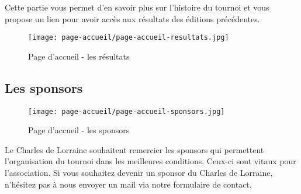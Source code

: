 Cette partie vous permet d'en savoir plus sur l'histoire du tournoi et vous
propose un lien pour avoir accès aux résultats des éditions précédentes.

\begin{figure}[H]
\centering
\texttt{[image: page-accueil/page-accueil-resultats.jpg]}
\caption{Page d'accueil - les résultats}
\end{figure}

\subsection{Les sponsors}

\begin{figure}[H]
\centering
\texttt{[image: page-accueil/page-accueil-sponsors.jpg]}
\caption{Page d'accueil - les sponsors}
\end{figure}

Le Charles de Lorraine souhaitent remercier les sponsors qui permettent
l'organisation du tournoi dans les meilleures conditions. Ceux-ci sont vitaux
pour l'association. Si vous souhaitez devenir un sponsor du Charles de Lorraine,
n'hésitez pas à nous envoyer un mail via notre formulaire de contact.
